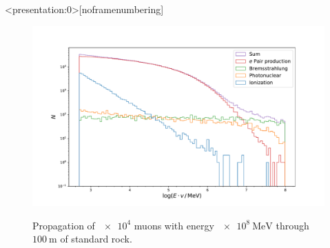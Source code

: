 \documentclass[aspectratio=1610, captions=tableheading, 11pt]{beamer}
\begin{document}
\begin{frame}<presentation:0>[noframenumbering]
\begin{figure}
  \begin{minipage}[c]{0.7\textwidth}
    \includegraphics[width=\textwidth , trim=1.9cm 0.5cm 1.9cm 2cm,clip=true]{plots/standard.pdf}
  \end{minipage}\hfill
  \begin{minipage}[c]{0.3\textwidth}
    Propagation of $\num{e4}$ muons with energy $\SI{e8}{\mega\electronvolt}$ through $\SI{100}{\metre}$ of standard rock.
     \label{fig:03-03}
  \end{minipage}
\end{figure}

\end{frame}
\end{document}
